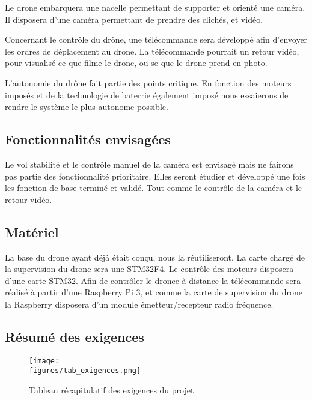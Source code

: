 \vspace{1cm}
Le drone embarquera une nacelle permettant de supporter et orienté une caméra. \newline
Il disposera d'une caméra permettant de prendre des clichés, et vidéo.

\vspace{1cm}
Concernant le contrôle du drône, une télécommande sera développé afin d'envoyer les ordres de déplacement au drone. La télécommande pourrait un retour vidéo, pour visualisé ce que filme le drone, ou se que le drone prend en photo.

\vspace{1cm}
L'autonomie du drône fait partie des points critique. En fonction des moteurs imposés et de la technologie de baterrie également imposé nous essaierons de rendre le système le plus autonome possible.

\subsection{Fonctionnalités envisagées}

Le vol stabilité et le contrôle manuel de la caméra est envisagé mais ne fairons pas partie des fonctionnalité prioritaire. Elles seront étudier et développé une fois les fonction de base terminé et validé. Tout comme le contrôle de la caméra et le retour vidéo.

\subsection{Matériel}

La base du drone ayant déjà était conçu, nous la réutiliseront. \newline
La carte chargé de la supervision du drone sera une STM32F4. \newline
Le contrôle des moteurs disposera  d'une carte STM32.
Afin de contrôler le dronee à distance la télécommande sera réalisé à partir d'une Raspberry Pi 3, et comme la carte de supervision du drone la Raspberry disposera d'un module émetteur/recepteur radio fréquence. 


\subsection{Résumé des exigences}
\begin{figure}[H]
	\centering
    \texttt{[image: \\figures/tab\_exigences.png]}
    \decoRule
    \caption[
    Tableau récapitulatif des exigences du projet]{
    Tableau récapitulatif des exigences du projet}
    \label{fig:Tableau récapitulatif des exigences du projet}
	\end{figure}


